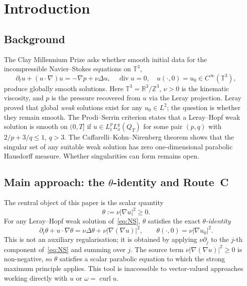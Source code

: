 \documentclass[11pt]{article}
\theoremstyle{definition}
\theoremstyle{remark}
\newcommand{\R}{\mathbb{R}}
\newcommand{\Z}{\mathbb{Z}}
\newcommand{\T}{\mathbb{T}}
\newcommand{\prt}{\partial_t}
\newcommand{\grad}{\nabla}
\newcommand{\divg}{\operatorname{div}}
\newcommand{\curl}{\operatorname{curl}}
\begin{document}
\tableofcontents

\section{Introduction}
\label{sec:intro}

\subsection{Background}
\label{sec:intro-background}

The Clay Millennium Prize \cite{Fefferman2000} asks whether smooth initial data
for the incompressible Navier--Stokes equations on $\T^3$,
\begin{equation}\label{eq:NS}
  \prt u + (u\cdot\grad)u = -\grad p + \nu\Delta u,
  \quad \divg u = 0,
  \quad u(\cdot,0) = u_0\in C^\infty(\T^3),
\end{equation}
produce globally smooth solutions.  Here $\T^3 = \R^3/\Z^3$, $\nu>0$ is the
kinematic viscosity, and $p$ is the pressure recovered from $u$ via the Leray
projection.  Leray \cite{Leray1934} proved that global \emph{weak} solutions
exist for any $u_0\in L^2$; the question is whether they remain smooth.  The
Prodi--Serrin criterion \cite{Prodi1959,Serrin1962} states that a Leray--Hopf
weak solution is smooth on $(0,T]$ if $u\in L^p_t L^q_x(Q_T)$ for some pair
$(p,q)$ with $2/p+3/q\leq 1$, $q>3$.  The Caffarelli--Kohn--Nirenberg
theorem \cite{CKN1982} shows that the singular set of any suitable weak
solution has zero one-dimensional parabolic Hausdorff measure.  Whether
singularities can form remains open.

\subsection{Main approach: the $\theta$-identity and Route~C}
\label{sec:intro-approach}

The central object of this paper is the scalar quantity
\begin{equation}\label{eq:theta-def}
  \theta := \nu|\grad u|^2 \geq 0.
\end{equation}
For any Leray--Hopf weak solution of~\eqref{eq:NS}, $\theta$ satisfies the
exact \emph{$\theta$-identity}
\begin{equation}\label{eq:theta}
  \prt\theta + u\cdot\grad\theta
  = \nu\Delta\theta + \nu\bigl|\grad(\grad u)\bigr|^2,
  \qquad \theta(\cdot,0) = \nu|\grad u_0|^2.
\end{equation}
This is not an auxiliary regularisation; it is obtained by applying
$\nu\partial_j$ to the $j$-th component of~\eqref{eq:NS} and summing over $j$.
The source term $\nu|\grad(\grad u)|^2 \geq 0$ is non-negative, so $\theta$
satisfies a scalar parabolic equation to which the strong maximum principle
applies.  This tool is inaccessible to vector-valued approaches working
directly with $u$ or $\omega = \curl u$.
\end{document}
